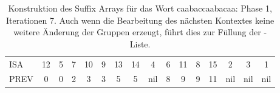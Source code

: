 \begin{table}[H]
\begin{adjustbox}{max width=\textwidth}
\begin{tabular}{lccccccccccccccc}
\multicolumn{1}{l|}{ISA}     & 12                      & 5                         & 7                       & 10                         & 9                           & 13                        & 14                         & 4                       & 6                        & 11 & 8                       & 15  & 2   & 3   & 1   \\
\multicolumn{1}{l|}{PREV}    & 0                       & \cellcolor[HTML]{\red}0 & 2                       & 3                          & 3                           & 5                         & 5                          & nil                     & 8                        & 9  & 9                       & 11  & nil & nil & nil
\end{tabular}
\end{adjustbox}

\caption[Konstruktion des Suffix Arrays für das Wort caabaccaabacaa: Phase 1, Iterationen 7]{Konstruktion des Suffix Arrays für das Wort caabaccaabacaa: Phase 1, Iterationen 7. Auch wenn die Bearbeitung des nächsten Kontextes keine weitere Änderung der Gruppen erzeugt, führt dies zur Füllung der \prevpointer-Liste.}
\label{table_complex_example_1_7} 
\end{table}

